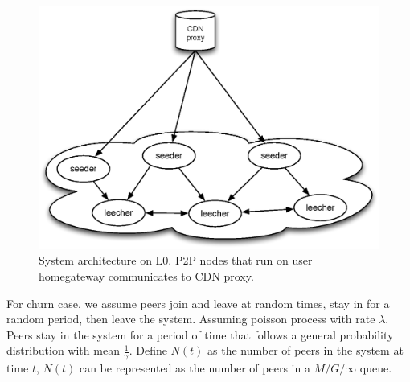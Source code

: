 \documentclass[paper]{ieice}
\begin{document}
\begin{figure}[tb] 
\begin{center}
\includegraphics[scale=0.35]{graphs/two-tier-cdn-topology-2.eps}
\end{center}
\caption{System architecture on L0. P2P nodes that run on user homegateway communicates to CDN proxy.}
\label{fig:twotier2}
\vspace{-2mm}
 \end{figure}


For churn case, we assume peers join and leave at random times, stay in for a random period, then leave the system.
Assuming poisson process with rate $\lambda$.
Peers stay in the system for a period of time that follows a general probability distribution with mean $\frac{1}{\gamma}$.
Define $N(t)$ as the number of peers in the system at time $t$, $N(t)$ can be represented as the number of peers in a $M/G/\infty$ queue.
\end{document}
